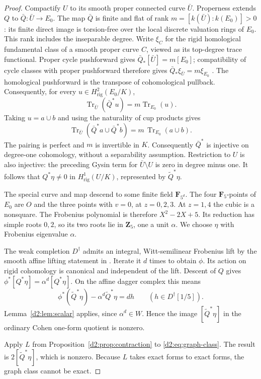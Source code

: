 \documentclass[11pt,a4paper]{amsart}
\numberwithin{equation}{section}
\theoremstyle{definition}
\theoremstyle{remark}
\newcommand{\DtwoZZ}{\mathbf{Z}}
\newcommand{\DtwoFF}{\mathbf{F}}
\newcommand{\Dtwowt}{\widetilde}
\newcommand{\Dtworig}{\mathrm{rig}}
\DeclareMathOperator{\DtwoTr}{Tr}
\begin{document}
\begin{proof}
Compactify \(U\) to its smooth proper connected curve \(\bar U\).
Properness extends \(Q\) to
\(\bar Q\colon\bar U\to E_0\).
The map \(\bar Q\) is finite and flat of rank
\(m=[k(\bar U):k(E_0)]>0\): its finite direct image is
torsion-free over the local discrete valuation rings of \(E_0\).
This rank includes the inseparable degree.
Write \(\xi_C\) for the rigid homological fundamental class of a
smooth proper curve \(C\), viewed as its top-degree trace functional.
Proper cycle pushforward gives
\(\bar Q_*[\bar U]=m[E_0]\); compatibility of cycle classes with
proper pushforward therefore gives
\(\bar Q_*\xi_{\bar U}=m\xi_{E_0}\)
\cite[Proposition~2.2, Section~2.1, and Proposition~6.4]{Petrequin2003}.
The homological pushforward is the transpose of cohomological
pullback. Consequently, for every
\(u\in H^2_{\mathrm{rig}}(E_0/K)\),
\[
 \DtwoTr_{\bar U}(\bar Q^*u)=m\DtwoTr_{E_0}(u).
\]
Taking \(u=a\cup b\) and using the naturality of cup products gives
\[
 \DtwoTr_{\bar U}(\bar Q^*a\cup\bar Q^*b)
   =m\,\DtwoTr_{E_0}(a\cup b).
\]
The pairing is perfect and \(m\) is invertible in \(K\).
Consequently \(\bar Q^*\) is injective on degree-one cohomology,
without a separability assumption.
Restriction to \(U\) is also injective: the preceding Gysin term
for \(\bar U\setminus U\) is zero in degree minus one.
It follows that \(Q^*\eta\ne0\) in \(H^1_\Dtworig(U/K)\), represented
by \(\Dtwowt Q^*\eta\).

The special curve and map descend to some finite field
\(\DtwoFF_{5^d}\).
The four \(\DtwoFF_5\)-points of \(E_0\) are \(O\) and the three
points with \(v=0\), at \(z=0,2,3\).
At \(z=1,4\) the cubic is a nonsquare.
The Frobenius polynomial is therefore \(X^2-2X+5\).
Its reduction has simple roots \(0,2\), so its two roots lie in
\(\DtwoZZ_5\), one a unit \(\alpha\).
We choose \(\eta\) with Frobenius eigenvalue \(\alpha\).

The weak completion \(D^\dagger\) admits an integral, Witt-semilinear
Frobenius lift by the smooth affine lifting statement in
\cite[Introduction, p.~198]{DLZ2011}.
Iterate it \(d\) times to obtain \(\phi\).
Its action on rigid cohomology is canonical and independent of the
lift.
Descent of \(Q\) gives
\(\phi^*[Q^*\eta]=\alpha^d[Q^*\eta]\).
On the affine dagger complex this means
\[
 \phi^*(\Dtwowt Q^*\eta)-\alpha^d\Dtwowt Q^*\eta=dh
 \qquad(h\in D^\dagger[1/5]).
\]
Lemma~\ref{d2:lem:scalar} applies, since \(\alpha^d\in W\).
Hence the image \([\Dtwowt Q^*\eta]\) in the ordinary Cohen one-form
quotient is nonzero.

Apply \(L\) from Proposition~\ref{d2:prop:contraction} to
\eqref{d2:eq:graph-class}.
The result is \(2[\Dtwowt Q^*\eta]\), which is nonzero.
Because \(L\) takes exact forms to exact forms, the graph class
cannot be exact.


\end{proof}
\end{document}
